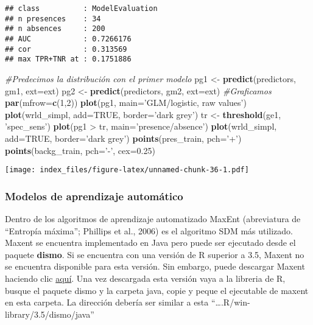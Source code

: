 \documentclass[]{article}
\newenvironment{Shaded}{\begin{snugshade}}{\end{snugshade}}
\newcommand{\KeywordTok}[1]{\textcolor[rgb]{0.13,0.29,0.53}{\textbf{{#1}}}}
\newcommand{\DataTypeTok}[1]{\textcolor[rgb]{0.13,0.29,0.53}{{#1}}}
\newcommand{\DecValTok}[1]{\textcolor[rgb]{0.00,0.00,0.81}{{#1}}}
\newcommand{\FloatTok}[1]{\textcolor[rgb]{0.00,0.00,0.81}{{#1}}}
\newcommand{\StringTok}[1]{\textcolor[rgb]{0.31,0.60,0.02}{{#1}}}
\newcommand{\CommentTok}[1]{\textcolor[rgb]{0.56,0.35,0.01}{\textit{{#1}}}}
\newcommand{\OtherTok}[1]{\textcolor[rgb]{0.56,0.35,0.01}{{#1}}}
\newcommand{\NormalTok}[1]{{#1}}
\begin{document}
\begin{verbatim}
## class          : ModelEvaluation 
## n presences    : 34 
## n absences     : 200 
## AUC            : 0.7266176 
## cor            : 0.313569 
## max TPR+TNR at : 0.1751886
\end{verbatim}

\begin{Shaded}
\begin{Highlighting}[]
\CommentTok{#Predecimos la distribución con el primer modelo}
\NormalTok{pg1 <-}\StringTok{ }\KeywordTok{predict}\NormalTok{(predictors, gm1, }\DataTypeTok{ext=}\NormalTok{ext)}
\NormalTok{pg2 <-}\StringTok{ }\KeywordTok{predict}\NormalTok{(predictors, gm2, }\DataTypeTok{ext=}\NormalTok{ext)}
\CommentTok{#Graficamos}
\KeywordTok{par}\NormalTok{(}\DataTypeTok{mfrow=}\KeywordTok{c}\NormalTok{(}\DecValTok{1}\NormalTok{,}\DecValTok{2}\NormalTok{))}
\KeywordTok{plot}\NormalTok{(pg1, }\DataTypeTok{main=}\StringTok{'GLM/logistic, raw values'}\NormalTok{)}
\KeywordTok{plot}\NormalTok{(wrld_simpl, }\DataTypeTok{add=}\OtherTok{TRUE}\NormalTok{, }\DataTypeTok{border=}\StringTok{'dark grey'}\NormalTok{)}
\NormalTok{tr <-}\StringTok{ }\KeywordTok{threshold}\NormalTok{(ge1, }\StringTok{'spec_sens'}\NormalTok{)}
\KeywordTok{plot}\NormalTok{(pg1 >}\StringTok{ }\NormalTok{tr, }\DataTypeTok{main=}\StringTok{'presence/absence'}\NormalTok{)}
\KeywordTok{plot}\NormalTok{(wrld_simpl, }\DataTypeTok{add=}\OtherTok{TRUE}\NormalTok{, }\DataTypeTok{border=}\StringTok{'dark grey'}\NormalTok{)}
\KeywordTok{points}\NormalTok{(pres_train, }\DataTypeTok{pch=}\StringTok{'+'}\NormalTok{)}
\KeywordTok{points}\NormalTok{(backg_train, }\DataTypeTok{pch=}\StringTok{'-'}\NormalTok{, }\DataTypeTok{cex=}\FloatTok{0.25}\NormalTok{)}
\end{Highlighting}
\end{Shaded}

\texttt{[image: index\_files/figure-latex/unnamed-chunk-36-1.pdf]}

\subsubsection{Modelos de aprendizaje
automático}\label{modelos-de-aprendizaje-automatico}

Dentro de los algoritmos de aprendizaje automatizado MaxEnt (abreviatura
de ``Entropía máxima''; Phillips et al., 2006) es el algoritmo SDM más
utilizado. Maxent se encuentra implementado en Java pero puede ser
ejecutado desde el paquete \textbf{dismo}. Si se encuentra con una
versión de R superior a 3.5, Maxent no se encuentra disponible para esta
versión. Sin embargo, puede descargar Maxent haciendo clic
\href{http://biodiversityinformatics.amnh.org/open_source/maxent/}{aquí}.
Una vez descargada esta versión vaya a la libreria de R, busque el
paquete dismo y la carpeta java, copie y peque el ejecutable de maxent
en esta carpeta. La dirección debería ser similar a esta
``\ldots{}.R/win-library/3.5/dismo/java''
\end{document}
